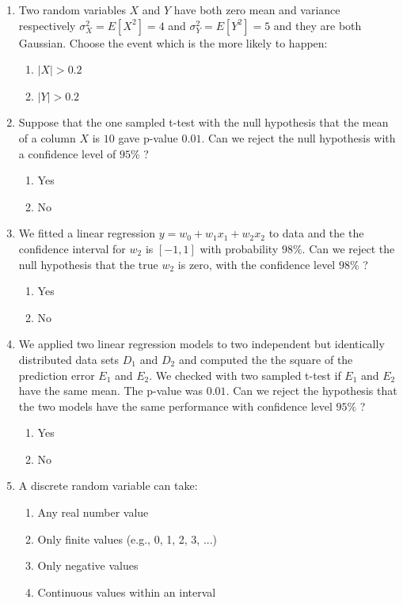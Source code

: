 \documentclass[10pt, oneside]{article}
\begin{document}
\begin{enumerate}
    \item Two random variables $X$ and $Y$ have both zero mean and variance respectively
    $\sigma_X^2=E[X^2]=4$ and $\sigma_Y^2=E[Y^2]=5$ and they are both Gaussian. Choose the event which is the more likely to happen:
    \begin{enumerate}
    \item $|X| > 0.2$
    \item $|Y| > 0.2$
    \end{enumerate}
    
    \item Suppose that the one sampled t-test with the null hypothesis 
    that  the mean of a column 
    $X$ is $10$ gave p-value $0.01$.
    Can we reject the null hypothesis with a confidence level of $95\%$ ?
    \begin{enumerate}
    \item Yes
    \item No
    \end{enumerate}
    
    \item We fitted a linear regression $y = w_0 + w_1 x_1+w_2 x_2$ to data and the the confidence interval for $w_2$ is $[-1,1]$ with probability $98\%$. Can we reject the null hypothesis that the true $w_2$ is zero, with the confidence level $98\%$ ? 
    \begin{enumerate}
    \item Yes
    \item No
    \end{enumerate}
    
    \item We applied two linear regression models to two independent but identically distributed data sets
          $D_1$ and $D_2$ 
          and computed the the square of the prediction error $E_1$ and $E_2$. We checked with two sampled t-test if $E_1$ and $E_2$
          have the same mean. The p-value was $0.01$.
          Can we reject the hypothesis that the two models have the 
          same performance with confidence level $95\%$ ? 
          \begin{enumerate}
          \item Yes
          \item No
          \end{enumerate}

    \item A discrete random variable can take:
    \begin{enumerate}
        \item Any real number value
        \item Only finite values (e.g., 0, 1, 2, 3, ...)
        \item Only negative values
        \item Continuous values within an interval
    \end{enumerate}


\end{enumerate}
\end{document}
